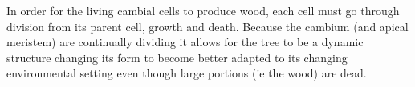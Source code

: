 In order for the living cambial cells to produce wood, each cell must go through
division from its parent cell, growth and death. Because the cambium (and apical
meristem) are continually dividing it allows for the tree to be a dynamic
structure changing its form to become better adapted to its changing
environmental setting even though large portions (ie the wood) are dead. 